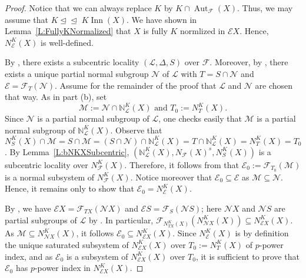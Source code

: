 \documentclass[reqno,11pt]{amsart}
\numberwithin{equation}{section}
\theoremstyle{definition}
\newcommand{\bN}{\mathbb{N}}
\newcommand{\F}{\mathcal{F}}
\newcommand{\E}{\mathcal{E}}
\renewcommand{\L}{\mathcal{L}}
\newcommand{\M}{\mathcal{M}}
\newcommand{\N}{\mathcal{N}}
\newcommand{\Aut}{\operatorname{Aut}}
\newcommand{\Inn}{\operatorname{Inn}}
\newcommand{\subn}{\unlhd\!\unlhd\;}
\begin{document}
\begin{proof}
Notice that we can always replace $K$ by $K\cap \Aut_\F(X)$. Thus, we may assume that $K\subn K\Inn(X)$. We have shown in Lemma~\ref{L:FullyKNormalized} that $X$ is fully $K$ normlized in $\E X$. Hence, $N_\E^K(X)$ is well-defined. 

\smallskip

By \cite[Theorem~A(b)]{Henke:2015}, there exists a subcentric locality $(\L,\Delta,S)$ over $\F$. Moreover, by \cite[Theorem~A]{Chermak/Henke}, there exists a unique partial normal subgroup $\N$ of $\L$ with $T=S\cap\N$ and $\E=\F_T(\N)$. Assume for the remainder of the proof that $\L$ and $\N$ are chosen that way. As in part (b), set
\[\M:=\N\cap \bN_\L^K(X)\mbox{ and }T_0:=N_T^K(X).\] 
Since $\N$ is a partial normal subgroup of $\L$, one checks easily that $\M$ is a partial normal subgroup of $\bN_\L^K(X)$. Observe that $N_S^K(X)\cap\M=S\cap \M=(S\cap \N)\cap \bN_\L^K(X)=T\cap \bN_\L^K(X)=N_T^K(X)=T_0$. By Lemma~\ref{L:bNKXSubcentric}, $(\bN_\L^K(X),N_\F(X)^s,N_S^K(X))$ is a subcentric locality over $N_\F^K(X)$. Therefore, it follows from \cite[Theorem~A]{Chermak/Henke} that $\E_0:=\F_{T_0}(\M)$ is a normal subsystem of $N_\F^K(X)$. Notice moreover that $\E_0\subseteq\E$ as $\M\subseteq\N$. Hence, it remains only to show that $\E_0=N_\E^K(X)$.

\smallskip 

By \cite[Theorem~G(b)]{Chermak/Henke}, we have $\E X=\F_{TX}(\N X)$ and $\E S=\F_S(\N S)$; here $\N X$ and $\N S$ are partial subgroups of $\L$ by \cite[Lemma~3.20]{Chermak/Henke}. In particular, $\F_{N_{T X}^K(X)}(N_{\N X}^K(X))\subseteq N_{\E X}^K(X)$. As $\M\subseteq N_{\N X}^K(X)$, it follows $\E_0\subseteq N_{\E X}^K(X)$. Since $N_\E^K(X)$ is by definition the unique saturated subsystem of $N_{\E X}^K(X)$ over $T_0:=N_T^K(X)$ of $p$-power index, and as $\E_0$ is a subsystem of $N_{\E X}^K(X)$ over $T_0$, it is sufficient to prove that $\E_0$ has $p$-power index in $N_{\E X}^K(X)$. 

\smallskip


\end{proof}
\end{document}
